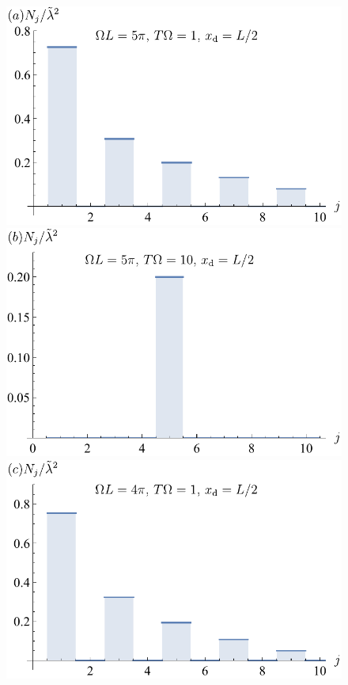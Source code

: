 \documentclass[prd,twocolumn,superscriptaddress,nofootinbib,floatfix,amsmath,amssymb]{revtex4-2}
\begin{document}
    \begin{figure}[tp]
        \includegraphics[scale=0.5]{Fig7a.pdf}
        \includegraphics[scale=0.5]{Fig7b.pdf}
        \includegraphics[scale=0.5]{Fig7c.pdf}

\end{figure}
\end{document}
